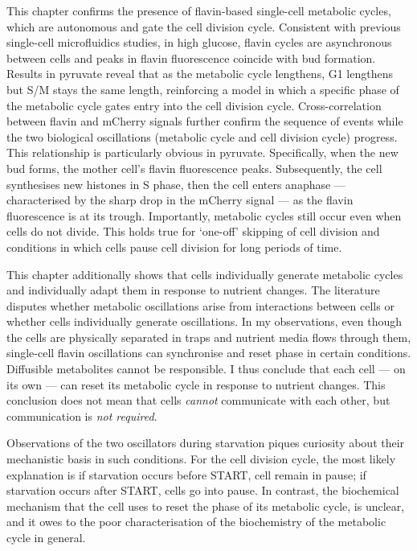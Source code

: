This chapter confirms the presence of flavin-based single-cell metabolic cycles, which are autonomous and gate the cell division cycle.
Consistent with previous single-cell microfluidics studies, in high glucose, flavin cycles are asynchronous between cells and peaks in flavin fluorescence coincide with bud formation.
Results in pyruvate reveal that as the metabolic cycle lengthens, G1 lengthens but S/M stays the same length, reinforcing a model in which a specific phase of the metabolic cycle gates entry into the cell division cycle.
Cross-correlation between flavin and mCherry signals further confirm the sequence of events while the two biological oscillations (metabolic cycle and cell division cycle) progress.
This relationship is particularly obvious in pyruvate.
Specifically, when the new bud forms, the mother cell's flavin fluorescence peaks.
Subsequently, the cell synthesises new histones in S phase, then the cell enters anaphase --- characterised by the sharp drop in the mCherry signal --- as the flavin fluorescence is at its trough.
Importantly, metabolic cycles still occur even when cells do not divide.
This holds true for `one-off' skipping of cell division and conditions in which cells pause cell division for long periods of time.

This chapter additionally shows that cells individually generate metabolic cycles and individually adapt them in response to nutrient changes.
The literature disputes whether metabolic oscillations arise from interactions between cells or whether cells individually generate oscillations.
In my observations, even though the cells are physically separated in traps and nutrient media flows through them, single-cell flavin oscillations can synchronise and reset phase in certain conditions.
Diffusible metabolites cannot be responsible.
I thus conclude that each cell --- on its own --- can reset its metabolic cycle in response to nutrient changes.
This conclusion does not mean that cells \emph{cannot} communicate with each other, but communication is \emph{not required}.

Observations of the two oscillators during starvation piques curiosity about their mechanistic basis in such conditions.
For the cell division cycle, the most likely explanation is if starvation occurs before START, cell remain in pause; if starvation occurs after START, cells go into pause.
In contrast, the biochemical mechanism that the cell uses to reset the phase of its metabolic cycle, is unclear, and it owes to the poor characterisation of the biochemistry of the metabolic cycle in general.

